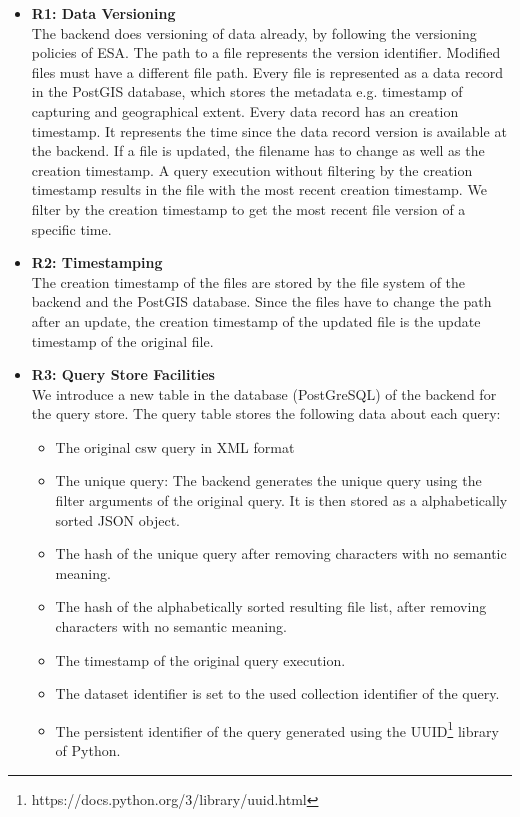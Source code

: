 \documentclass[draft,final]{vutinfth} %
\newcommand{\bgoesswein}[1]{{\color{blue}#1}}
\begin{document}
\begin{itemize}
	\item \textbf{R1: Data Versioning} \\
	The backend does versioning of data already, by following the versioning policies of ESA. The path to a file represents the version identifier. Modified files must have a different file path. \bgoesswein{Every file is represented as a data record in the PostGIS database, which stores the metadata e.g. timestamp of capturing and geographical extent. Every data record has an creation timestamp. It represents the time since the data record version is available at the backend. If a file is updated, the filename has to change as well as the creation timestamp. A query execution without filtering by the creation timestamp results in the file with the most recent creation timestamp. We filter by the creation timestamp to get the most recent file version of a specific time.}
	\item \textbf{R2: Timestamping} \\
	The creation timestamp of the files are stored by the file system of the backend and the PostGIS database. Since the files have to change the path after an update, the creation timestamp of the updated file is the update timestamp of the original file. 
	\item \textbf{R3: Query Store Facilities} \\
	We introduce a new table in the database (PostGreSQL) of the backend for the query store. The query table stores the following data about each query:
	\begin{itemize}
		\item The original \acrshort{csw} query in XML format
		\item The unique query: The backend generates the unique query using the filter arguments of the original query. It is then stored as a alphabetically sorted JSON object. 
		\item The hash of the unique query after removing characters with no semantic meaning.
		\item The hash of the alphabetically sorted resulting file list, after removing characters with no semantic meaning. 
		\item The timestamp of the original query execution.
		\item The dataset identifier is set to the used collection identifier of the query.
		\item The persistent identifier of the query generated using the UUID\footnote{https://docs.python.org/3/library/uuid.html} library of Python.

\end{itemize}
\end{itemize}
\end{document}
